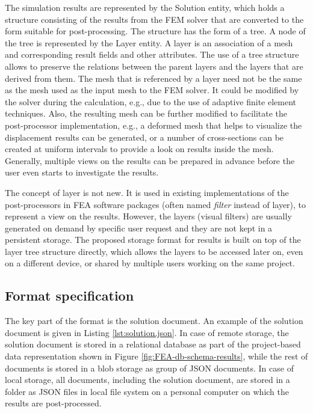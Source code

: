 The simulation results are represented by the Solution entity, which holds a structure consisting of the results from the FEM solver that are converted to the form suitable for post-processing. The structure has the form of a tree. A node of the tree is represented by the Layer entity. A layer is an association of a mesh and corresponding result fields and other attributes. The use of a tree structure allows to preserve the relations between the parent layers and the layers that are derived from them. The mesh that is referenced by a layer need not be the same as the mesh used as the input mesh to the FEM solver. It could be modified by the solver during the calculation, e.g., due to the use of adaptive finite element techniques. Also, the resulting mesh can be further modified to facilitate the post-processor implementation, e.g., a deformed mesh that helps to visualize the displacement results can be generated, or a number of cross-sections can be created at uniform intervals to provide a look on results inside the mesh. Generally, multiple views on the results can be prepared in advance before the user even starts to investigate the results.

The concept of layer is not new. It is used in existing implementations of the post-processors in FEA software packages (often named \textit{filter} instead of layer), to represent a view on the results. However, the layers (visual filters) are usually generated on demand by specific user request and they are not kept in a persistent storage. The proposed storage format for results is built on top of the layer tree structure directly, which allows the layers to be accessed later on, even on a different device, or shared by multiple users working on the same project.


\subsection{Format specification}

The key part of the format is the solution document. An example of the solution document is given in Listing \ref{lst:solution.json}. In case of remote storage, the solution document is stored in a relational database as part of the project-based data representation shown in Figure \ref{fig:FEA-db-schema-results}, while the rest of documents is stored in a blob storage as group of JSON documents. In case of local storage, all documents, including the solution document, are stored in a folder as JSON files in local file system on a personal computer on which the results are post-processed.

